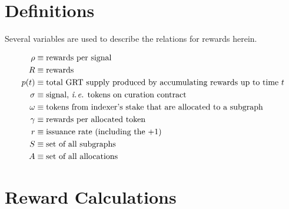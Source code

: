 {\newpage

\section*{Definitions}
Several variables are used to describe the relations for rewards herein.  

\begin{subequations}
\begin{align}
    \rho & \equiv \mbox{rewards per signal} \\
    R & \equiv \mbox{rewards} \\
    p(t) & \equiv \mbox{total GRT supply produced by accumulating rewards up to time $t$} \\
    \sigma & \equiv \mbox{signal, \ie tokens on curation contract} \\
    \omega & \equiv \mbox{tokens from indexer's stake that are allocated to a subgraph} \\
    \gamma & \equiv \mbox{rewards per allocated token} \\
    r & \equiv \mbox{issuance rate (including the $+1$)} \\
    S & \equiv \mbox{set of all subgraphs} \\
    A & \equiv \mbox{set of all allocations}
\end{align}
\end{subequations}


\section*{Reward Calculations}

}
